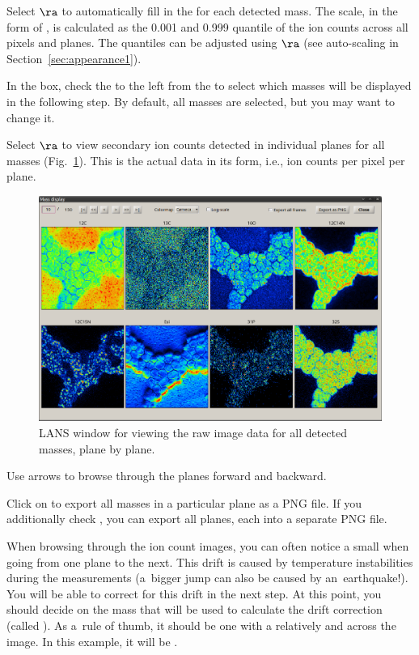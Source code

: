 \s Select  $\ra$  to automatically fill in the  for each detected mass. The scale, in the form of , is calculated as the 0.001 and 0.999 quantile of the ion counts across all pixels and planes. The quantiles can be adjusted using  $\ra$  (see auto-scaling in Section~\ref{sec:appearance1}). 

\s In the  box, check the   to the left from the  to select which masses will be displayed in the following step. By default, all masses are selected, but you may want to change it.

\s Select  $\ra$  to view secondary ion counts detected in individual planes for all masses (Fig.~\ref{fig:displayplanes}). This is the actual data in its  form, i.e., ion counts per pixel per plane.

\begin{figure}[!ht]
\centering
\includegraphics[width=\textwidth]{figs3/LANS-display-planes-raw}
\caption{\label{fig:displayplanes}%
LANS window for viewing the raw image data for all detected masses, plane by plane.}
\end{figure}

\nb
\bul Use arrows to browse through the planes forward and backward.

\bul Click on  to export all masses in a particular plane as a PNG file. If you additionally check , you can export all planes, each into a separate PNG file.

\bul
When browsing through the ion count images, you can often notice a small  when going from one plane to the next. This drift is caused by temperature instabilities during the measurements (a~bigger jump can also be caused by an~earthquake!). You will be able to correct for this drift in the next step. At this point, you should decide on the mass that will be used to calculate the drift correction (called ). As a~rule of thumb, it should be one with a relatively  and  across the image. In this example, it will be .

